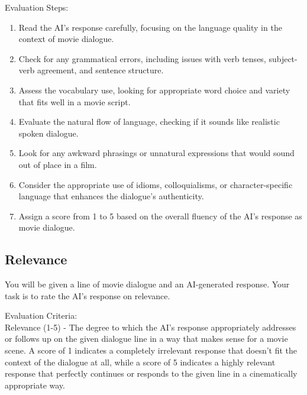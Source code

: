 \documentclass[stu,donotrepeattitle,floatsintext]{apa7}
\begin{document}
\begin{appendices}
        \bigskip
        \noindent Evaluation Steps:
        \begin{enumerate}
            \item Read the AI's response carefully, focusing on the language quality in the context of movie dialogue.
            \item Check for any grammatical errors, including issues with verb tenses, subject-verb agreement, and sentence structure.
            \item Assess the vocabulary use, looking for appropriate word choice and variety that fits well in a movie script.
            \item Evaluate the natural flow of language, checking if it sounds like realistic spoken dialogue.
            \item Look for any awkward phrasings or unnatural expressions that would sound out of place in a film.
            \item Consider the appropriate use of idioms, colloquialisms, or character-specific language that enhances the dialogue's authenticity.
            \item Assign a score from 1 to 5 based on the overall fluency of the AI's response as movie dialogue.
        \end{enumerate}

        \subsection{Relevance}\label{subsec:g-eval-relevance}

        \noindent You will be given a line of movie dialogue and an AI-generated response.
        Your task is to rate the AI's response on relevance.

        \bigskip
        \noindent Evaluation Criteria:\\
        \noindent Relevance (1-5) - The degree to which the AI's response appropriately addresses or follows up on the given dialogue line in a way that makes sense for a movie scene.
        A score of 1 indicates a completely irrelevant response that doesn't fit the context of the dialogue at all, while a score of 5 indicates a highly relevant response that perfectly continues or responds to the given line in a cinematically appropriate way.


\end{appendices}
\end{document}
